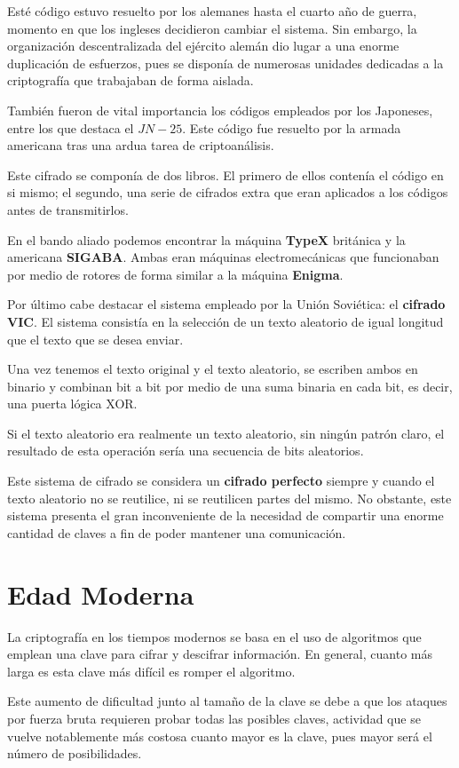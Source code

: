 \documentclass[nochap]{apuntesURJC}
\begin{document}
Esté código estuvo resuelto por los alemanes hasta el cuarto año de guerra, momento en que los ingleses decidieron cambiar el sistema. Sin embargo, la organización descentralizada del ejército alemán dio lugar a una enorme duplicación de esfuerzos, pues se disponía de numerosas unidades dedicadas a la criptografía que trabajaban de forma aislada.

También fueron de vital importancia los códigos empleados por los Japoneses, entre los que destaca el $JN-25$. Este código fue resuelto por la armada americana tras una ardua tarea de criptoanálisis.

Este cifrado se componía de dos libros. El primero de ellos contenía el código en si mismo; el segundo, una serie de cifrados extra que eran aplicados a los códigos antes de transmitirlos.

En el bando aliado podemos encontrar la máquina \textbf{TypeX} británica y la americana \textbf{SIGABA}. Ambas eran máquinas electromecánicas que funcionaban por medio de rotores de forma similar a la máquina \textbf{Enigma}.

Por último cabe destacar el sistema empleado por la Unión Soviética: el \textbf{cifrado VIC}. El sistema consistía en la selección de un texto aleatorio de igual longitud que el texto que se desea enviar.

Una vez tenemos el texto original y el texto aleatorio, se escriben ambos en binario y combinan bit a bit por medio de una suma binaria en cada bit, es decir, una puerta lógica XOR.

Si el texto aleatorio era realmente un texto aleatorio, sin ningún patrón claro, el resultado de esta operación sería una secuencia de bits aleatorios.

Este sistema de cifrado se considera un \textbf{cifrado perfecto} siempre y cuando el texto aleatorio no se reutilice, ni se reutilicen partes del mismo. No obstante, este sistema presenta el gran inconveniente de la necesidad de compartir una enorme cantidad de claves a fin de poder mantener una comunicación.

\section{Edad Moderna}
La criptografía en los tiempos modernos se basa en el uso de algoritmos que emplean una clave para cifrar y descifrar información. En general, cuanto más larga es esta clave más difícil es romper el algoritmo.

Este aumento de dificultad junto al tamaño de la clave se debe a que los ataques por fuerza bruta requieren probar todas las posibles claves, actividad que se vuelve notablemente más costosa cuanto mayor es la clave, pues mayor será el número de posibilidades.
\end{document}

